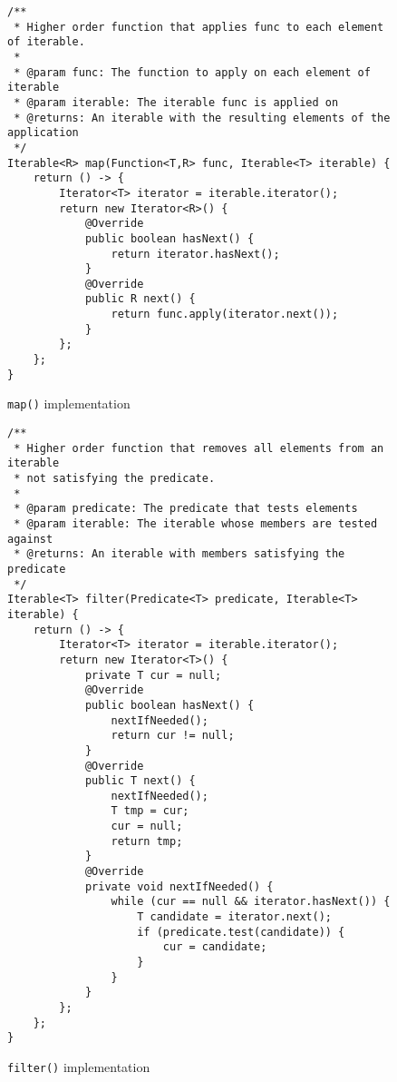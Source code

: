\message{ !name(thesis.tex)}\documentclass[abstracton,12pt]{scrartcl}
\theoremstyle{definition}
\begin{document}
\begin{figure}
  \centering
\begin{verbatim}
/**
 * Higher order function that applies func to each element of iterable.
 *
 * @param func: The function to apply on each element of iterable
 * @param iterable: The iterable func is applied on
 * @returns: An iterable with the resulting elements of the application
 */
Iterable<R> map(Function<T,R> func, Iterable<T> iterable) {
    return () -> {
        Iterator<T> iterator = iterable.iterator();
        return new Iterator<R>() {
            @Override
            public boolean hasNext() {
                return iterator.hasNext();
            }
            @Override
            public R next() {
                return func.apply(iterator.next());
            }
        };
    };
}
\end{verbatim}
  \caption{\texttt{map()} implementation}
  \label{fig:java_map}
\end{figure}

\begin{figure}
  \centering
\begin{verbatim}
/**
 * Higher order function that removes all elements from an iterable
 * not satisfying the predicate.
 *
 * @param predicate: The predicate that tests elements
 * @param iterable: The iterable whose members are tested against
 * @returns: An iterable with members satisfying the predicate
 */
Iterable<T> filter(Predicate<T> predicate, Iterable<T> iterable) {
    return () -> {
        Iterator<T> iterator = iterable.iterator();
        return new Iterator<T>() {
            private T cur = null;
            @Override
            public boolean hasNext() {
                nextIfNeeded();
                return cur != null; 
            }
            @Override
            public T next() {
                nextIfNeeded();
                T tmp = cur;
                cur = null;
                return tmp;
            }
            @Override
            private void nextIfNeeded() {
                while (cur == null && iterator.hasNext()) {
                    T candidate = iterator.next();
                    if (predicate.test(candidate)) {
                        cur = candidate;
                    }
                }
            }
        };
    };
}
\end{verbatim}
  \caption{\texttt{filter()} implementation}
  \label{fig:java_filter}
\end{figure}

\newpage



\end{document}

